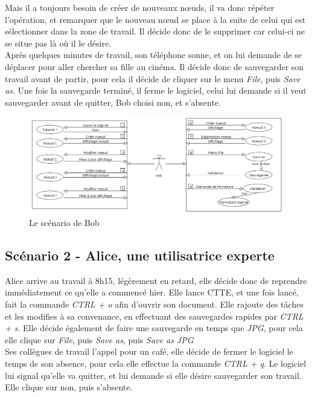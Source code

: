 \documentclass[12pt, a4paper]{article}
\begin{document}
Mais il a toujours besoin de créer de nouveaux nœuds, il va donc répéter l'opération, et remarquer que le nouveau nœud se place à la suite de celui qui est sélectionner dans la zone de travail. Il décide donc de le supprimer car celui-ci ne se situe pas là où il le désire.\\


Après quelques minutes de travail, son téléphone sonne, et on lui demande de se déplacer pour aller chercher sa fille au cinéma. Il décide donc de sauvegarder son travail avant de partir, pour cela il décide de cliquer sur le menu \emph{File}, puis \emph{Save as}. Une fois la sauvegarde terminé, il ferme le logiciel, celui lui demande si il veut sauvegarder avant de quitter, Bob choisi non, et s'absente.\\

\newpage
\begin{figure}[h]
\begin{center}
   \includegraphics[scale = 0.4]{scenario-bob.png}
	\caption{Le scénario de Bob}
	\end{center}
\end{figure}


\subsection{Scénario 2 - Alice, une utilisatrice experte}


Alice arrive au travail à 8h15, légèrement en retard, elle décide donc de reprendre immédiatement ce qu'elle a commencé hier. Elle lance CTTE, et une fois lancé, fait la commande \emph{CTRL + o} afin d'ouvrir son document. Elle rajoute des tâches et les modifies à sa convenance, en effectuant des sauvegardes rapides par \emph{CTRL + s}. Elle décide également de faire une sauvegarde en temps que \emph{JPG}, pour cela elle clique sur \emph{File}, puis \emph{Save as}, puis \emph{Save as JPG} \\


Ses collègues de travail l'appel pour un café, elle décide de fermer le logiciel le temps de son absence, pour cela elle effectue la commande \emph{CTRL + q}. Le logiciel lui signal qu'elle va quitter, et lui demande si elle désire sauvegarder son travail. Elle clique sur non, puis s'absente.\\
\end{document}
